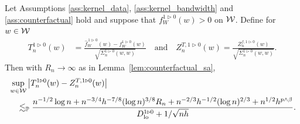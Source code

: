 \begin{lemma}
  \label{lem:counterfactual_infeasible_t_statistic}

  Let Assumptions \ref{ass:kernel_data},
  \ref{ass:kernel_bandwidth} and
  \ref{ass:counterfactual}
  hold and suppose that
  $f_W^{1 \triangleright 0}(w) > 0$ on $\mathcal{W}$.
  Define for $w \in \mathcal{W}$
  \begin{align*}
    T_n^{1 \triangleright 0}(w)
    &= \frac{\hat f_W^{\,1 \triangleright 0}(w)
    - f_W^{1 \triangleright 0}(w)}
    {\sqrt{\Sigma_n^{1 \triangleright 0}(w,w)}}
    \quad\text{and}\quad
    Z_n^{T, 1 \triangleright 0}(w)
    = \frac{Z_n^{f, 1 \triangleright 0}(w)}
    {\sqrt{\Sigma_n^{1 \triangleright 0}(w,w)}}.
  \end{align*}
  Then with $R_n \to \infty$ as in Lemma~\ref{lem:counterfactual_sa},
  \begin{align*}
    &\sup_{w \in \mathcal{W}}
    \left|
    T_n^{1 \triangleright 0}(w) - Z_n^{T, 1 \triangleright 0}(w)
    \right| \\
    &\quad\lesssim_{\mathbb{P}}
    \frac{
      n^{-1/2} \log n
      + n^{-3/4} h^{-7/8} (\log n)^{3/8} R_n
      + n^{-2/3} h^{-1/2} (\log n)^{2/3}
      + n^{1/2} h^{p \wedge \beta}}
    {D_{\textup{lo}}^{1 \triangleright 0} + 1/\sqrt{nh}}.
  \end{align*}

\end{lemma}

